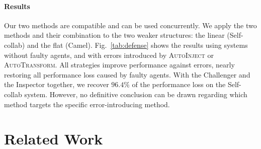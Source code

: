 \documentclass{article}
\theoremstyle{plain}
\theoremstyle{definition}
\theoremstyle{remark}
\begin{document}
\begin{table}[t]
    \centering
    \caption{The performance of Self-collab and Camel in code generation using different settings. ``C+I'' represents the combination of ``Challenger'' and ``Inspector.''}
    \label{tab:defense}
\end{table}

\paragraph{Results}

Our two methods are compatible and can be used concurrently.
We apply the two methods and their combination to the two weaker structures: the linear (Self-collab) and the flat (Camel).
Fig.~\ref{tab:defense} shows the results using systems without faulty agents, and with errors introduced by \textsc{AutoInject} or \textsc{AutoTransform}.
All strategies improve performance against errors, nearly restoring all performance loss caused by faulty agents.
With the Challenger and the Inspector together, we recover $96.4\%$ of the performance loss on the Self-collab system.
However, no definitive conclusion can be drawn regarding which method targets the specific error-introducing method.
\section{Related Work}
\label{sec:related-work}
\end{document}
